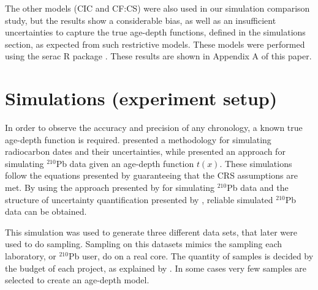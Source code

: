 \documentclass [10pt] {article}
\begin{document}

The other models (CIC and CF:CS) were also used in our simulation comparison study, but the results show a considerable bias, as well as an insufficient uncertainties to capture the true age-depth functions, defined in the simulations section, as expected from such restrictive models.
These models were performed using the serac R package \citep{Bruel_2020}. 
These results are shown in Appendix A of this paper.





\section{Simulations (experiment setup)}

	In order to observe the accuracy and precision of any chronology, a known true age-depth function is required.
\citet{Blaauw2018} presented a methodology for simulating radiocarbon dates and their uncertainties, while \citet{Aquino2018} presented an approach for simulating $^{210}$Pb data given an age-depth function $t(x)$.
These simulations follow the equations presented by \cite{Appleby1978, Robbins1978} guaranteeing that the CRS assumptions are met. 
By using the approach presented by \citet{Aquino2018} for simulating $^{210}$Pb data and the structure of uncertainty quantification presented by \citet{Blaauw2018}, reliable simulated $^{210}$Pb data can be obtained.

	This simulation was used to generate three different data sets, that later were used to do sampling. 
Sampling on this datasets mimics the sampling each laboratory, or $^{210}$Pb user, do on a real core. 
The quantity of samples is decided by the budget of each project, as explained by \citet{Blaauw2018}. 
In some cases very few samples are selected to create an age-depth model.
\end{document}
